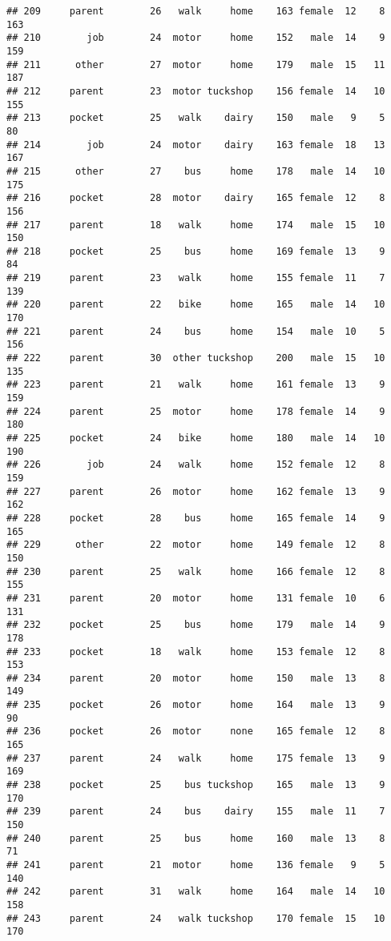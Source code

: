 \documentclass[
]{article}
\begin{document}
\begin{verbatim}
## 209     parent        26   walk     home    163 female  12    8     163
## 210        job        24  motor     home    152   male  14    9     159
## 211      other        27  motor     home    179   male  15   11     187
## 212     parent        23  motor tuckshop    156 female  14   10     155
## 213     pocket        25   walk    dairy    150   male   9    5      80
## 214        job        24  motor    dairy    163 female  18   13     167
## 215      other        27    bus     home    178   male  14   10     175
## 216     pocket        28  motor    dairy    165 female  12    8     156
## 217     parent        18   walk     home    174   male  15   10     150
## 218     pocket        25    bus     home    169 female  13    9      84
## 219     parent        23   walk     home    155 female  11    7     139
## 220     parent        22   bike     home    165   male  14   10     170
## 221     parent        24    bus     home    154   male  10    5     156
## 222     parent        30  other tuckshop    200   male  15   10     135
## 223     parent        21   walk     home    161 female  13    9     159
## 224     parent        25  motor     home    178 female  14    9     180
## 225     pocket        24   bike     home    180   male  14   10     190
## 226        job        24   walk     home    152 female  12    8     159
## 227     parent        26  motor     home    162 female  13    9     162
## 228     pocket        28    bus     home    165 female  14    9     165
## 229      other        22  motor     home    149 female  12    8     150
## 230     parent        25   walk     home    166 female  12    8     155
## 231     parent        20  motor     home    131 female  10    6     131
## 232     pocket        25    bus     home    179   male  14    9     178
## 233     pocket        18   walk     home    153 female  12    8     153
## 234     parent        20  motor     home    150   male  13    8     149
## 235     pocket        26  motor     home    164   male  13    9      90
## 236     pocket        26  motor     none    165 female  12    8     165
## 237     parent        24   walk     home    175 female  13    9     169
## 238     pocket        25    bus tuckshop    165   male  13    9     170
## 239     parent        24    bus    dairy    155   male  11    7     150
## 240     parent        25    bus     home    160   male  13    8      71
## 241     parent        21  motor     home    136 female   9    5     140
## 242     parent        31   walk     home    164   male  14   10     158
## 243     parent        24   walk tuckshop    170 female  15   10     170

\end{verbatim}
\end{document}
